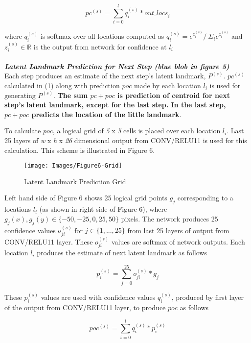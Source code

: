 \documentclass [11pt,letterpaper ,twoside ,openany ]{report}
\begin{document}
    \[ pc^{(s)} = \displaystyle\sum_{i=0}^{l} q^{(s)}_i * \textit{out\_locs}_i \tag{1}\]

    \noindent
    where \(q_i^{(s)}\) is softmax over all locations computed as \(q_i^{(s)} = e^{z_i^{(s)}}/\ \Sigma_i e^{z_i^{(s)}} \) and \(z_i^{(s)} \in  \mathbb{R} \)   is the output from network for confidence at \(l_i \)\\\\

    \noindent
    \textbf{\textit{Latent Landmark Prediction for Next Step (blue blob in figure 5)}}\\
    Each step produces an estimate of the next step's latent landmark, \(P^{(s)}\). \(pc^{(s)} \) calculated in (1) along with prediction \(poc\) made by each location \(l_i\) is used for generating \(P^{(s)}\). \textbf{The sum \(pc + poc\) is prediction of centroid for next step's latent landmark, except for the last step. In the last step, \(pc + poc\) predicts the location of the little landmark}.

    To calculate \(poc\), a logical grid of \textit {5} x \textit {5} cells is placed over each location \(l_i\). Last 25 layers of \textit {w} x \textit {h} x \textit {26} dimensional output from CONV/RELU11 is used for this calculation. This scheme is illustrated in Figure 6.

    \begin{figure}[t]
      \centering
      \texttt{[image: Images/Figure6-Grid]}
      \caption{Latent Landmark Prediction Grid}
      \label{fig:grid}
    \end{figure}

    Left hand side of Figure 6 shows 25 logical grid points \(g_j\) corresponding to a locations \(l_i\) (as shown in right side of Figure 6), where \(g_j(x), g_j(y) \in \{-50, -25, 0, 25, 50\} \) pixels. The network produces 25 confidence values \(o_{ji}^{(s)}\) for \(j \in \{1, ..., 25\} \) from last 25 layers of output from CONV/RELU11 layer. These \(o_{ji}^{(s)}\) values are softmax of network outputs. Each location \(l_i\) produces the estimate of next latent landmark as follows

    \[      p_i^{(s)} = \displaystyle\sum_{j=0}^{25} o_{ji}^{(s)} * g_j \tag{2} \]

    \noindent
    These \( p_i^{(s)} \) values are used with confidence values \(q_i^{(s)} \), produced by first layer of the output from CONV/RELU11 layer, to produce \( poc \) as follows

    \[      poc^{(s)} = \displaystyle\sum_{i=0}^{l} q_i^{(s)} * p_i^{(s)} \]
\end{document}
